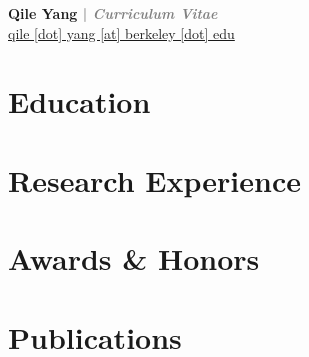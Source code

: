 \documentclass[11pt]{article} %
\newcommand{\myinput}[1]{
  
}
\newcommand{\socialicon}[2]{
  \hypersetup{hidelinks}
  \href{https://#2}{#1}
  \hypersetup{hidelinks=false}
}
\begin{document}

\begin{center}
  \Large\textbf{Qile Yang \textcolor{gray}{| \emph{Curriculum Vitae}}}\normalsize \\
  \href{mailto:qile.yang@berkeley.edu}{qile [dot] yang [at] berkeley [dot] edu} \\
  \socialicon{\faGlobe}{qile0317.github.io}
  \socialicon{\faLinkedin}{linkedin.com/in/qile0317}
  \socialicon{\faGithub}{github.com/Qile0317}
  \socialicon{\faGoogle}{scholar.google.com/citations?user=IsJeImQAAAAJ&hl=en}
  \socialicon{\faResearchgate}{www.researchgate.net/profile/Qile-Yang-2}
  \socialicon{\faOrcid}{orcid.org/my-orcid?orcid=0009-0005-0148-2499}
\end{center}

\RaggedRight


\section*{Education}
\myinput{education.tex}

\section*{Research Experience}
\label{exp_research}
\myinput{exp_research.tex}

\section*{Awards \& Honors}
\label{awards}
\myinput{awards.tex}


\newpage

\section*{Publications}
\label{pubs}

\end{document}
